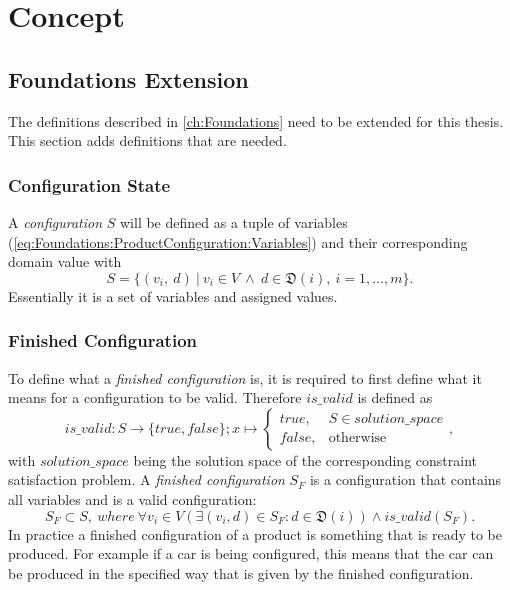 \chapter{Concept}
\label{ch:Concept}

\section{Foundations Extension}
\label{sec:Concept:Requirements}

The definitions described in \autoref{ch:Foundations} need to be extended for this thesis. This section adds definitions that are needed.

\subsection{Configuration State}

A \emph{configuration} $S$ will be defined as a tuple of variables (\autoref{eq:Foundations:ProductConfiguration:Variables}) and their corresponding domain value with
\begin{equation} \label{eq:Foundations:ProductConfiguration:ConfigurationState}
    S = \{ (v_i,\ d) \ |\ v_i \in V \ \land \ d \in \mathfrak{D}(i),\ i=1,\dotsc,m \}.
\end{equation}
Essentially it is a set of variables and assigned values.

\subsection{Finished Configuration}
To define what a \emph{finished configuration} is, it is required to first define what it means for a configuration to be valid. Therefore $is\_valid$ is defined as
\begin{equation} \label{eq:Foundations:ProductConfiguration:IsValid}
    is\_valid : S \to \{true, false\}; x \mapsto 
    \begin{cases}
        true, & S \in solution\_space \\
        false, & \text{otherwise}
    \end{cases},
\end{equation}
with $solution\_space$ being the solution space of the corresponding constraint satisfaction problem. A \emph{finished configuration} $S_F$ is a configuration that contains all variables and is a valid configuration:
\begin{equation} \label{eq:Foundations:ProductConfiguration:FinishedConfiguration}
    S_F \subset S,\ where \ \forall v_i \in V (\exists (v_i, d) \in S_F : d \in \mathfrak{D}(i)) \land is\_valid(S_F).
\end{equation}
In practice a finished configuration of a product is something that is ready to be produced. For example if a car is being configured, this means that the car can be produced in the specified way that is given by the finished configuration.


